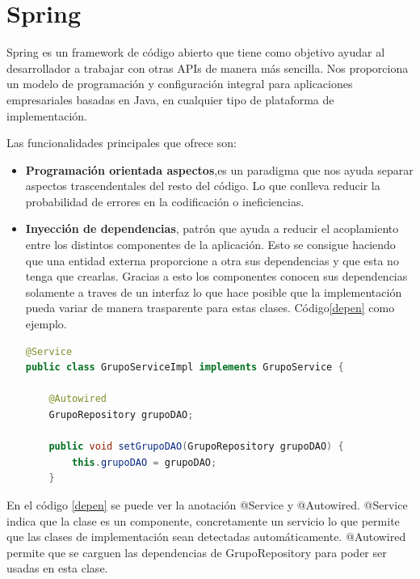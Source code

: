 	
	
\section{Spring}
Spring es un framework de código abierto que tiene como objetivo ayudar al desarrollador a trabajar con otras APIs de manera más sencilla. Nos proporciona un modelo de programación y configuración integral para aplicaciones empresariales basadas en Java, en cualquier tipo de plataforma de implementación. 
	
Las funcionalidades principales que ofrece son:

\begin{itemize}
\item \textbf{Programación orientada aspectos},es un paradigma que nos ayuda separar aspectos trascendentales del resto del código. Lo que conlleva reducir  la probabilidad de errores en la codificación o ineficiencias.


\item\textbf{ Inyección de dependencias}, patrón que ayuda a reducir el acoplamiento entre los distintos componentes de la aplicación. Esto se consigue haciendo que una entidad externa proporcione a otra sus dependencias y que esta no tenga que crearlas.
Gracias a esto los componentes conocen sus dependencias solamente a traves de un interfaz lo que hace posible que la implementación pueda variar de manera trasparente para estas clases. Código\ref{depen} como ejemplo.




 \begin{lstlisting}[language=java,caption={Inyección de dependencias},label=depen]
@Service
public class GrupoServiceImpl implements GrupoService {

	@Autowired
	GrupoRepository grupoDAO;

	public void setGrupoDAO(GrupoRepository grupoDAO) {
		this.grupoDAO = grupoDAO;
	}


\end{lstlisting} 



\end{itemize}

En el código \ref{depen} se puede ver la anotación @Service y @Autowired. @Service indica que la clase es un componente, concretamente un servicio lo que permite que las clases de implementación sean detectadas automáticamente. @Autowired  permite que se carguen las dependencias de GrupoRepository para poder ser usadas en esta clase.
